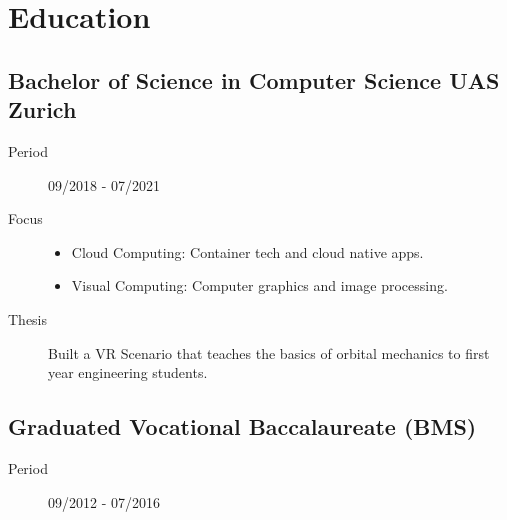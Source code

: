 \section{Education}
\subsection{Bachelor of Science in Computer Science UAS Zurich}
\begin{description}
    \item[Period] 09/2018 - 07/2021
    \item[Focus] 
    \begin{itemize}
        \item Cloud Computing: Container tech and cloud native apps.
        \item Visual Computing: Computer graphics and image processing.
    \end{itemize}
    \item[Thesis] Built a VR Scenario that teaches the basics of orbital mechanics to first year engineering students.
\end{description}
\dottedline

\subsection{Graduated Vocational Baccalaureate (BMS)}
\begin{description}
    \item[Period] 09/2012 - 07/2016
\end{description}
